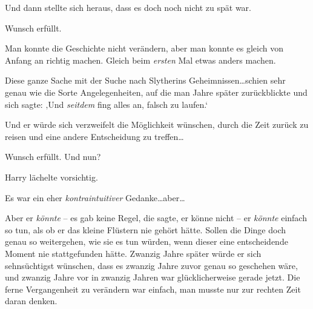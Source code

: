 Und dann stellte sich heraus, dass es doch noch nicht zu spät war.

Wunsch erfüllt.

Man konnte die Geschichte nicht verändern, aber man konnte es gleich von Anfang an richtig machen. Gleich beim \emph{ersten} Mal etwas anders machen.

Diese ganze Sache mit der Suche nach Slytherins Geheimnissen…schien sehr genau wie die Sorte Angelegenheiten, auf die man Jahre später zurückblickte und sich sagte: ‚Und \emph{seitdem} fing alles an, falsch zu laufen.‘

Und er würde sich verzweifelt die Möglichkeit wünschen, durch die Zeit zurück zu reisen und eine andere Entscheidung zu treffen…

Wunsch erfüllt. Und nun?

Harry lächelte vorsichtig.

Es war ein eher \emph{kontraintuitiver} Gedanke…aber…

Aber er \emph{könnte} – es gab keine Regel, die sagte, er könne nicht – er \emph{könnte} einfach so tun, als ob er das kleine Flüstern nie gehört hätte. Sollen die Dinge doch genau so weitergehen, wie sie es tun würden, wenn dieser eine entscheidende Moment nie stattgefunden hätte. Zwanzig Jahre später würde er sich sehnsüchtigst wünschen, dass es zwanzig Jahre zuvor genau so geschehen wäre, und zwanzig Jahre vor in zwanzig Jahren war glücklicherweise gerade jetzt. Die ferne Vergangenheit zu verändern war einfach, man musste nur zur rechten Zeit daran denken.

